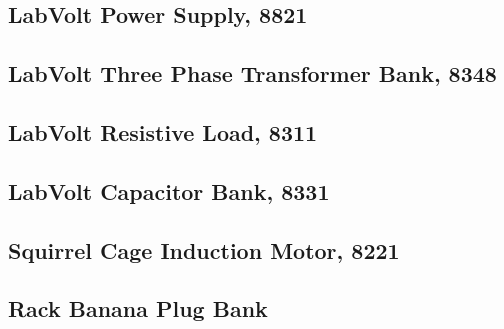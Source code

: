 \subsection{LabVolt Power Supply, 8821}

\newpage
\subsection{LabVolt Three Phase Transformer Bank, 8348}

\newpage
\subsection{LabVolt Resistive Load, 8311}

\newpage
\subsection{LabVolt Capacitor Bank, 8331}

\newpage
\subsection{Squirrel Cage Induction Motor, 8221}

\newpage
\subsection{Rack Banana Plug Bank}

